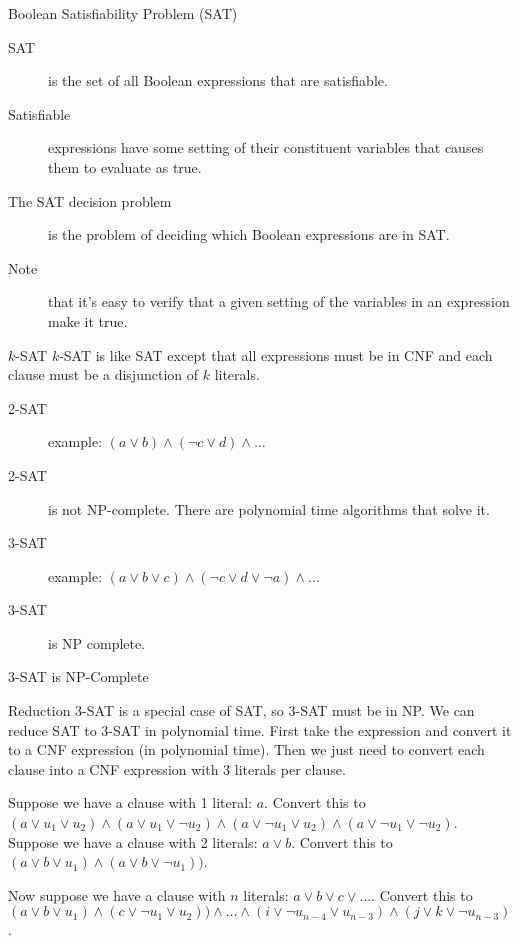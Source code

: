 \begin{frame}{Boolean Satisfiability Problem (SAT)}
  \begin{description}
    \item[SAT] is the set of all Boolean expressions that are satisfiable.
    \item[Satisfiable] expressions have some setting of their constituent variables that causes them to evaluate as true.
    \item[The SAT decision problem] is the problem of deciding which Boolean expressions are in SAT.
    \item[Note] that it's easy to verify that a given setting of the variables in an expression make it true.
  \end{description}
\end{frame}


\begin{frame}{$k$-SAT}
  $k$-SAT is like SAT except that all expressions must be in CNF and each clause must be a disjunction of $k$ literals.

  \vspace{2mm}

  \begin{description}
    \item[2-SAT] example: $(a \lor b) \land (\neg c \lor d) \land \ldots$
    \item[2-SAT] is not NP-complete. There are polynomial time algorithms that solve it.
    \item[3-SAT] example: $(a \lor b \lor c) \land (\neg c \lor d \lor \neg a) \land \ldots$
    \item[3-SAT] is NP complete.
  \end{description}
\end{frame}


\begin{frame}{3-SAT is NP-Complete}

  \begin{alertblock}{Reduction}
    3-SAT is a special case of SAT, so 3-SAT must be in NP.
    We can reduce SAT to 3-SAT in polynomial time.
    First take the expression and convert it to a CNF expression (in polynomial time).
    Then we just need to convert each clause into a CNF expression with 3 literals per clause.
    
    Suppose we have a clause with 1 literal: $a$.
    Convert this to $(a \lor u_1 \lor u_2) \land (a \lor u_1 \lor \neg u_2) \land (a \lor \neg u_1 \lor u_2) \land (a \lor \neg u_1 \lor \neg u_2)$.
    Suppose we have a clause with 2 literals: $a \lor b$.
    Convert this to $(a \lor b \lor u_1) \land (a \lor b \lor \neg u_1))$.
    
    Now suppose we have a clause with $n$ literals: $a \lor b \lor c \lor \ldots$.
    Convert this to $(a \lor b \lor u_1) \land (c \lor \neg u_1 \lor u_2)) \land \ldots \land (i \lor \neg u_{n-4} \lor u_{n-3}) \land (j \lor k \lor \neg u_{n-3})$.
  \end{alertblock}

\end{frame}


